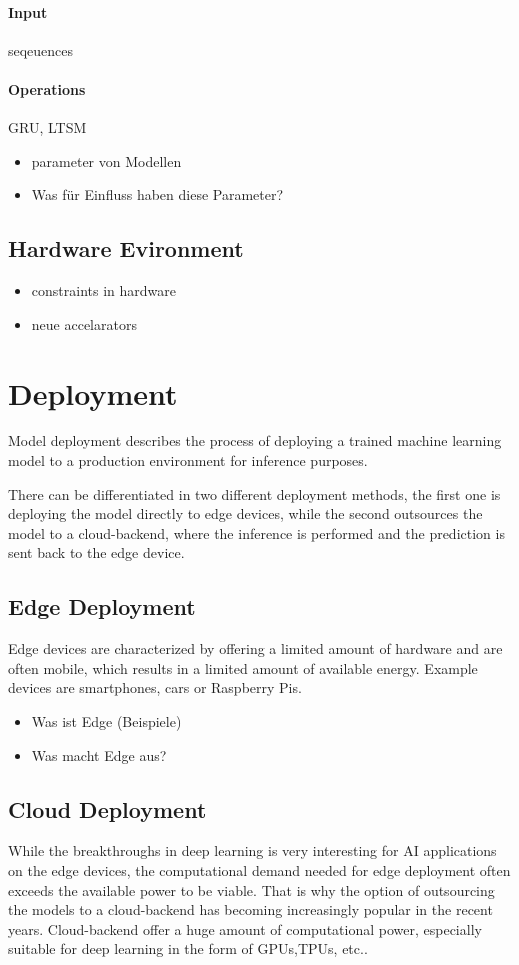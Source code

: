 \paragraph{Input}
seqeuences
\paragraph{Operations}
GRU, LTSM
\begin{itemize}
    \item parameter von Modellen
    \item Was für Einfluss haben diese Parameter?
\end{itemize}
\subsection{Hardware Evironment}
\begin{itemize}
    \item constraints in hardware
    \item neue accelarators
    
\end{itemize}
\section{Deployment}
Model deployment describes the process of deploying a trained machine learning model to a production environment for inference purposes. 

There can be differentiated in two different deployment methods, the first one is deploying the model directly to edge devices, while the second outsources the model to a cloud-backend, where the inference is performed and the prediction is sent back to the edge device.
\subsection{Edge Deployment}
Edge devices are characterized by offering a limited amount of hardware and are often mobile, which results in a limited amount of available energy. 
Example devices are smartphones, cars or Raspberry Pis.

 

\begin{itemize}
    \item Was ist Edge (Beispiele)
    \item Was macht Edge aus?
\end{itemize}
\subsection{Cloud Deployment}
While the breakthroughs in deep learning is very interesting for AI applications on the edge devices, the computational demand needed for edge deployment often exceeds the available power to be viable.
That is why the option of outsourcing the models to a cloud-backend has becoming increasingly popular in the recent years.
Cloud-backend offer a huge amount of computational power, especially suitable for deep learning in the form of GPUs,TPUs, etc..


